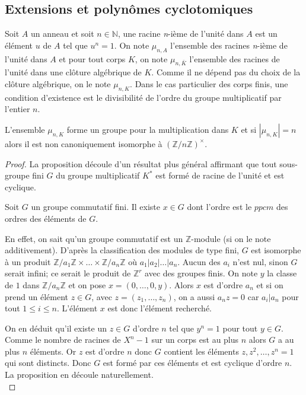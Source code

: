 \documentclass[a4paper]{article} %
\numberwithin{section}{part}
\numberwithin{equation}{section}
\newcommand\nroot[1]{\textit{#1}-ième}
\newcommand\zmodn[1]{\mathbb{Z}/#1\mathbb{Z}}
\newcommand\zmodninv[1]{(\mathbb{Z}/#1\mathbb{Z})^{\times}}
\newcommand\ZZ{\mathbb{Z}}
\newcommand\NN{\mathbb{N}}
\begin{document}
\subsection{Extensions et polynômes cyclotomiques}
Soit $A$ un anneau et soit $n\in\NN$, une racine \nroot{n} de l'unité dans $A$ 
est un élément $u$ de $A$ tel que $u^n = 1$. On note $\mu_{n,A}$ l'ensemble des 
racines \nroot{n} de l'unité dans $A$ et pour tout corps $K$, on note 
$\mu_{n,\bar{K}}$ l'ensemble des racines de l'unité dans une clôture algébrique 
de $K$. Comme il ne dépend pas du choix de la clôture algébrique, on le note 
$\mu_{n,K}$. Dans le cas particulier des corps finis, une condition d'existence 
est le divisibilité de l'ordre du groupe multiplicatif par l'entier $n$.\par

\begin{prop}
\label{prop:rootcycl}
L'ensemble $\mu_{n,K}$ forme un groupe pour la multiplication dans $K$ et si 
$|\mu_{n,K}| = n$ alors il est non canoniquement isomorphe à $\zmodninv{n}$.
\end{prop}
\begin{proof}
La proposition découle d'un résultat plus général affirmant que tout sous-groupe
fini $G$ du groupe multiplicatif $K^*$ est formé de racine de l'unité et est 
cyclique. 
\begin{lem}
Soit $G$ un groupe commutatif fini. Il existe $x\in G$ dont l'ordre est le 
$ppcm$ des ordres des éléments de $G$.
\end{lem}
En effet, on sait qu'un groupe commutatif est un $\ZZ$-module (si on le note 
additivement). D'après la classification des modules de type fini, $G$ est 
isomorphe à un produit $\zmodn{a_1}\times\dots\times\zmodn{a_n}$ où 
$a_1|a_2|\dots|a_n$. Aucun des $a_i$ n'est nul, sinon $G$ serait infini; 
ce serait le produit de $\ZZ^r$ avec des groupes finis. On note $y$ la classe 
de $1$ dans $\zmodn{a_n}$ et on pose $x = (0,\dots,0,y)$. Alors $x$ est d'ordre 
$a_n$ et si on prend un élément $z\in G$, avec $z = (z_1,\dots,z_n)$, on a aussi
$a_nz = 0$ car $a_i|a_n$ pour tout $1\leq i \leq n$. L'élément $x$ est donc
l'élément recherché.\par
On en déduit qu'il existe un $z\in G$ d'ordre $n$ tel que $y^n = 1$ pour 
tout $y\in G$. Comme le nombre de racines de $X^n - 1$ sur un corps est au plus 
$n$ alors $G$ a au plus $n$ éléments. Or $z$ est d'ordre $n$ donc $G$ contient 
les éléments $z, z^2,\dots,z^n = 1$ qui sont distincts. Donc $G$ est formé par 
ces éléments et est cyclique d'ordre $n$. La proposition en découle 
naturellement.\\
\end{proof}
\end{document}

